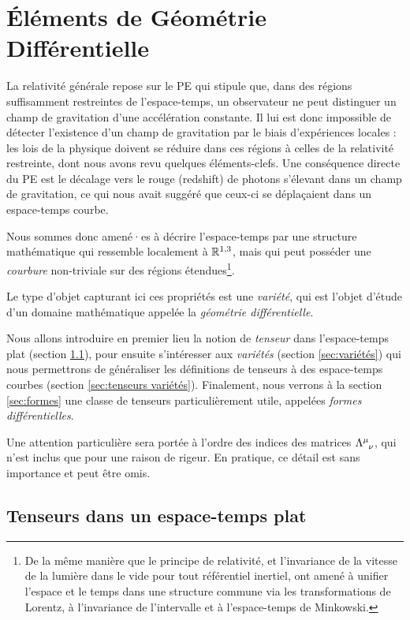 {
\renewcommand\indexmarker{\cdot}

\chapter{Éléments de Géométrie Différentielle}
La relativité générale repose sur le PE qui stipule que, dans des régions suffisamment restreintes de l'espace-temps, un observateur ne peut distinguer un champ de gravitation d'une accélération constante. Il lui est donc impossible de détecter l'existence d'un champ de gravitation par le biais d'expériences locales : les lois de la physique doivent se réduire dans ces régions à celles de la relativité restreinte, dont nous avons revu quelques éléments-clefs. Une conséquence directe du PE est le décalage vers le rouge (redshift) de photons s'élevant dans un champ de gravitation, ce qui nous avait suggéré que ceux-ci se déplaçaient dans un espace-temps courbe.

Nous sommes donc amené\!·\!es à décrire l'espace-temps par une structure mathématique qui ressemble localement à $\mathbb{R}^{1,3}$, mais qui peut posséder une \emph{courbure} non-triviale sur des régions étendues\footnote{De la même manière que le principe de relativité, et l'invariance de la vitesse de la lumière dans le vide pour tout référentiel inertiel, ont amené à unifier l'espace et le temps dans une structure commune via les transformations de Lorentz, à l'invariance de l'intervalle et à l'espace-temps de Minkowski.}.

Le type d'objet capturant ici ces propriétés est une \emph{variété}, qui est l'objet d'étude d'un domaine mathématique appelée la \emph{géométrie différentielle}. 

Nous allons introduire en premier lieu la notion de \emph{tenseur} dans l'espace-temps plat (section \ref{sec:tenseurs plats}), pour ensuite s'intéresser aux \emph{variétés} (section \ref{sec:variétés}) qui nous permettrons de généraliser les définitions de tenseurs à des espace-temps courbes (section \ref{sec:tenseurs variétés}). Finalement, nous verrons à la section \ref{sec:formes} une classe de tenseurs particulièrement utile, appelées \emph{formes différentielles}.

Une attention particulière sera portée à l'ordre des indices des matrices $\Lambda\indices{^\mu_\nu}$, qui n'est inclus que pour une raison de rigeur. En pratique, ce détail est sans importance et peut être omis.
\section{Tenseurs dans un espace-temps plat}
\label{sec:tenseurs plats}
}
